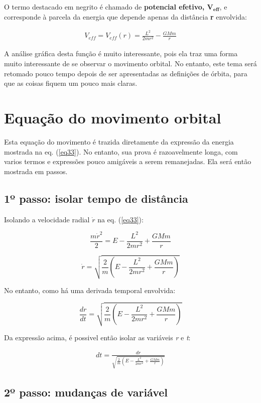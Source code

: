 O termo destacado em negrito é chamado de \textbf{potencial efetivo, $\mathbf{V_{eff}}$}, e corresponde à parcela da energia que depende apenas da distância \textbf{r} envolvida:

\begin{eqnarray}
    V_{eff} = V_{eff}(r)  = \frac{L^2}{2mr^2} - \frac{GMm}{r} \label{eq34}
\end{eqnarray}

A análise gráfica desta função é muito interessante, pois ela traz uma forma muito interessante de se observar o movimento orbital. No entanto, este tema será retomado pouco tempo depois de ser apresentadas as definições de órbita, para que as coisas fiquem um pouco mais claras.

\section{Equação do movimento orbital}

Esta equação do movimento é trazida diretamente da expressão da energia mostrada na eq. (\ref{eq33}). No entanto, sua prova é razoavelmente longa, com varios termos e expressões pouco amigáveis a serem remanejadas. Ela será então mostrada em passos.

\subsection{1º passo: isolar tempo de distância}

Isolando a velocidade radial $\dot{r}$ na eq. (\ref{eq33}):

\[
	\frac{m\dot{r}^2}{2} = E - \frac{L^2}{2mr^2} + \frac{GMm}{r}
\]

\[
	 \dot{r} = \sqrt{\frac{2}{m}\left(E - \frac{L^2}{2mr^2} + \frac{GMm}{r}\right)}
\]

No entanto, como há uma derivada temporal envolvida:

\[
	\frac{dr}{dt} = \sqrt{\frac{2}{m}\left(E - \frac{L^2}{2mr^2} + \frac{GMm}{r}\right)}
\]

Da expressão acima, é possivel então isolar as variáveis \textit{r} e \textit{t}:

\begin{eqnarray}
	dt = \frac{dr}{\sqrt{\frac{2}{m}\left(E - \frac{L^2}{2mr^2} + \frac{GMm}{r}\right)}} \label{eq35}
\end{eqnarray}

\subsection{2º passo: mudanças de variável}


